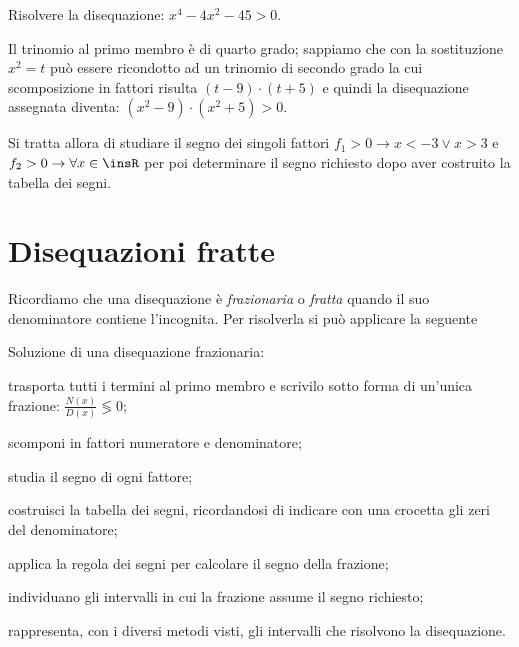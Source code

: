 \begin{esempio}
Risolvere la disequazione: $x^4-4x^2-45>0$.

Il trinomio al primo membro è di quarto grado; sappiamo che con la sostituzione 
$x^2=t$ può essere ricondotto ad un trinomio di secondo grado la cui 
scomposizione in fattori risulta $(t-9)\cdot (t+5)$ e quindi la disequazione 
assegnata diventa: $(x^2-9)\cdot (x^2+5)>0$.

Si tratta allora di studiare il segno dei singoli fattori $f_1>0\to x<-3\vee 
x>3$ e $f_2>0\to \forall x\in \insR$ per poi determinare il segno richiesto 
dopo 
aver costruito la tabella dei segni.
\end{esempio}
% 

\newpage %

\section{Disequazioni fratte}
\label{sec:diseq_fratte}

Ricordiamo che una disequazione è \emph{frazionaria} o \emph{fratta} quando il 
suo denominatore contiene l'incognita. Per risolverla si può applicare la 
seguente

\begin{procedura}
Soluzione di una disequazione frazionaria:
\begin{enumeratea}
\item trasporta tutti i termini al primo membro e scrivilo sotto forma di 
 un'unica frazione: $\frac{N(x)}{D(x)} \lessgtr 0$;
\item scomponi in fattori numeratore e denominatore;
\item studia il segno di ogni fattore;
\item costruisci la tabella dei segni, ricordandosi di indicare con una 
 crocetta gli zeri del denominatore;
\item applica la regola dei segni per calcolare il segno della frazione;
\item individuano gli intervalli in cui la frazione assume il segno richiesto;
\item rappresenta, con i diversi metodi visti, gli intervalli che 
 risolvono la disequazione.
\end{enumeratea}
\end{procedura}

